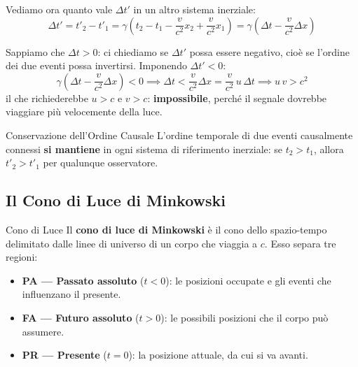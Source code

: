Vediamo ora quanto vale $\Delta t'$ in un altro sistema inerziale:
\begin{equation}
    \Delta t' = t'_2 - t'_1 = \gamma\left(t_2 - t_1 - \frac{v}{c^2}x_2 + \frac{v}{c^2}x_1\right)
    = \gamma\left(\Delta t - \frac{v}{c^2}\Delta x\right)
\end{equation}

Sappiamo che $\Delta t > 0$: ci chiediamo se $\Delta t'$ possa essere negativo, cioè se l'ordine dei due eventi possa invertirsi. Imponendo $\Delta t' < 0$:
\begin{equation*}
    \gamma\left(\Delta t - \frac{v}{c^2}\Delta x\right) < 0
    \implies \Delta t < \frac{v}{c^2}\Delta x = \frac{v}{c^2}\, u \,\Delta t
    \implies u\,v > c^2
\end{equation*}
il che richiederebbe $u > c$ e $v > c$: \textbf{impossibile}, perché il segnale dovrebbe viaggiare più velocemente della luce.

\begin{teorema}{Conservazione dell'Ordine Causale}
L'ordine temporale di due eventi causalmente connessi \textbf{si mantiene} in ogni sistema di riferimento inerziale: se $t_2 > t_1$, allora $t'_2 > t'_1$ per qualunque osservatore.
\end{teorema}

\subsection{Il Cono di Luce di Minkowski}

\begin{definizione}{Cono di Luce}
Il \textbf{cono di luce di Minkowski} è il cono dello spazio-tempo delimitato dalle linee di universo di un corpo che viaggia a $c$. Esso separa tre regioni:
\begin{itemize}[leftmargin=1.4em]
    \item \textbf{PA --- Passato assoluto} ($t<0$): le posizioni occupate e gli eventi che influenzano il presente.
    \item \textbf{FA --- Futuro assoluto} ($t>0$): le possibili posizioni che il corpo può assumere.
    \item \textbf{PR --- Presente} ($t=0$): la posizione attuale, da cui si va avanti.
\end{itemize}
\end{definizione}

